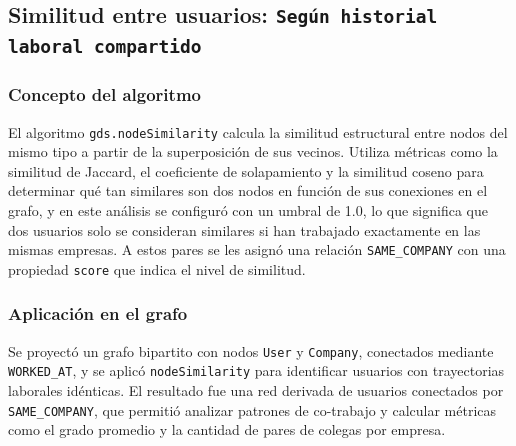 \documentclass[10pt]{article}
\begin{document}
\subsection{Similitud entre usuarios: \texttt{Según historial laboral compartido}}

\subsubsection*{Concepto del algoritmo}
El algoritmo \texttt{gds.nodeSimilarity} calcula la similitud estructural entre nodos del mismo tipo a partir de la superposición de sus vecinos. Utiliza métricas como la similitud de Jaccard, el coeficiente de solapamiento y la similitud coseno para determinar qué tan similares son dos nodos en función de sus conexiones en el grafo, y en este análisis se configuró con un umbral de 1.0, lo que significa que dos usuarios solo se consideran similares si han trabajado exactamente en las mismas empresas. A estos pares se les asignó una relación \texttt{SAME\_COMPANY} con una propiedad \texttt{score} que indica el nivel de similitud.

\subsubsection*{Aplicación en el grafo}
Se proyectó un grafo bipartito con nodos \texttt{User} y \texttt{Company}, conectados mediante \texttt{WORKED\_AT}, y se aplicó \texttt{nodeSimilarity} para identificar usuarios con trayectorias laborales idénticas. El resultado fue una red derivada de usuarios conectados por \texttt{SAME\_COMPANY}, que permitió analizar patrones de co-trabajo y calcular métricas como el grado promedio y la cantidad de pares de colegas por empresa.
\end{document}
